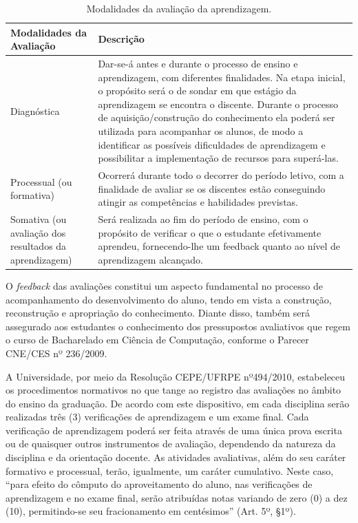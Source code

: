 \documentclass[
	12pt,				%
	openright,			%
  oneside,     %
	a4paper,			%
	chapter=TITLE,		%
	english,			%
	french,				%
	spanish,			%
	brazil				%
	]{abntex2}
\begin{document}
\begin{center}
    \begin{scriptsize}
      \begin{longtable}{p{5cm}p{10cm}}
        \caption{\label{quadro:modalidades_da_avaliacao_da_aprendizagem}Modalidades da avaliação da aprendizagem.}\\
      \toprule
      \textbf{Modalidades da Avaliação} & \textbf{Descrição} \\ 
      \midrule
        Diagnóstica 
                                & Dar-se-á antes e durante o processo de ensino e aprendizagem, com diferentes finalidades. Na etapa inicial, o propósito será o de sondar em que estágio da aprendizagem se encontra o discente. Durante o processo de aquisição/construção do conhecimento ela poderá ser utilizada para acompanhar os alunos, de modo a identificar as possíveis dificuldades de aprendizagem e possibilitar a implementação de recursos para superá-las. \\ \midrule
        Processual (ou formativa)
                                & Ocorrerá durante todo o decorrer do período letivo, com a finalidade de avaliar se os discentes estão conseguindo atingir as competências e habilidades previstas. \\ \midrule
        Somativa (ou avaliação dos resultados da aprendizagem)
                                & Será realizada ao fim do período de ensino, com o propósito de verificar o que o estudante efetivamente aprendeu, fornecendo-lhe um feedback quanto ao nível de aprendizagem alcançado. \\

      \bottomrule
      \end{longtable}
    \end{scriptsize}      
  \end{center}






O \textit{feedback} das avaliações constitui um aspecto fundamental no processo de acompanhamento do desenvolvimento do aluno, tendo em vista a construção, reconstrução e apropriação do conhecimento. Diante disso, também será assegurado aos estudantes o conhecimento dos pressupostos avaliativos que regem o curso de Bacharelado em Ciência de Computação, conforme o Parecer CNE/CES nº 236/2009.
	
A Universidade, por meio da Resolução CEPE/UFRPE nº494/2010, estabeleceu os procedimentos normativos no que tange ao registro das avaliações no âmbito do ensino da graduação. De acordo com este dispositivo, em cada disciplina serão realizadas três (3) verificações de aprendizagem e um exame final. Cada verificação de aprendizagem poderá ser feita através de uma única prova escrita ou de quaisquer outros instrumentos de avaliação, dependendo da natureza da disciplina e da orientação docente. As atividades avaliativas, além do seu caráter formativo e processual, terão, igualmente, um caráter cumulativo. Neste caso, “para efeito do cômputo do aproveitamento do aluno, nas verificações de aprendizagem e no exame final, serão atribuídas notas variando de zero (0) a dez (10), permitindo-se seu fracionamento em centésimos” (Art. 5º, §1º).
\end{document}
